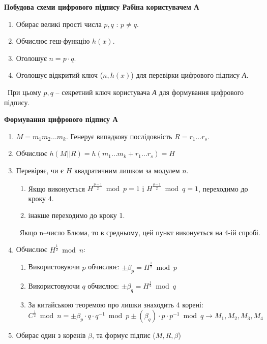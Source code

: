 \begin{center}
\textbf{Побудова схеми цифрового підпису Рабіна користувачем А}
\end{center}

\begin{enumerate}
        \item Обирає великі прості числа $p,q$ : $p\ne q$.
        \item Обчислює геш-функцію $h(x)$.
        \item Оголошує $n=p \cdot q$.
        \item Оголошує відкритий ключ ($n, h(x)$) для перевірки цифрового підпису \textsl{А}.     
\end{enumerate}
\ При цьому $p,q$ -- секретний ключ користувача \textsl{А} для формування цифрового підпису.

\begin{center}
\textbf{Формування цифрового підпису А}
\end{center}

\begin{enumerate}
        \item   $M =m_1m_2…m_k$. Генерує випадкову послідовність $R=r_1…r_s$.
        \item   Обчислює $h(M||R)=h(m_1…m_k+r_1…r_s)=H$
        \item Перевіряє, чи є $H$ квадратичним лишком за модулем $n$.
        \begin{enumerate}
                \item Якщо виконується $H^{\frac{p-1}{2}}\bmod p=1$ і $H^{\frac{q-1}{2}}\bmod q=1$, переходимо до кроку 4.
                \item інакше переходимо до кроку 1.
        \end{enumerate}
\ Якщо n--число Блюма, то в средньому, цей пункт виконується на 4-ій спробі.
    \item       Обчислює $H^{\frac{1}{2}}\bmod n$:
    \begin{enumerate}
    \item       Використовуючи $p$ обчислює: $\pm \beta_p=H^{\frac{1}{2}}\bmod p$
    \item Використовуючи $q$ обчислює: $\pm \beta_q=H^{\frac{1}{2}}\bmod q$
    \item   За китайською теоремою про лишки знаходить 4 корені: 
\[    
    C^{\frac{1}{2}}\bmod n={\pm \beta_p \cdot q \cdot q^{-1}\bmod p \pm ( \beta_q) \cdot p \cdot p^{-1}\bmod q} \rightarrow M_1,M_2,M_3,M_4
\]
\end{enumerate}
   \item Обирає один з коренів $\beta$, та формує підпис ($M,R, \beta$)
\end{enumerate}

